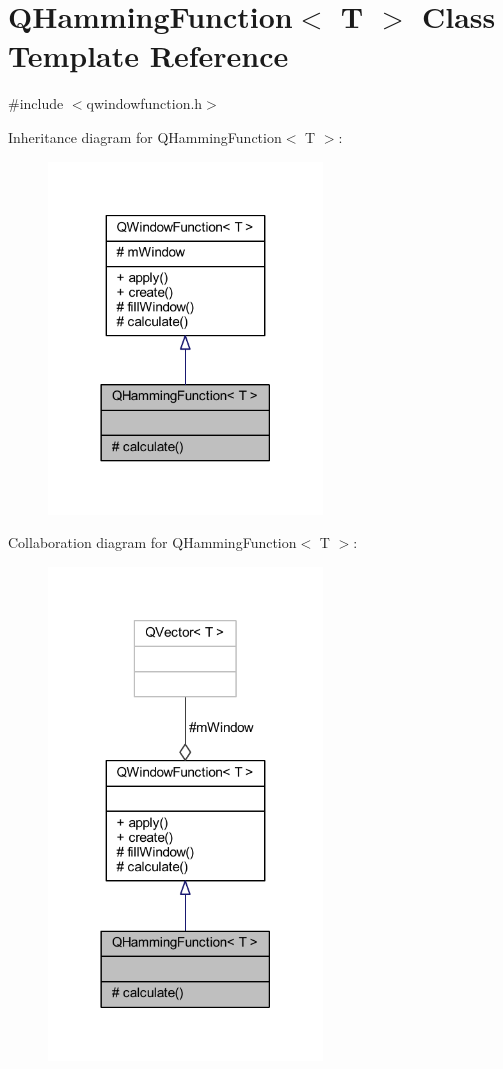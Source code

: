 \hypertarget{a00056}{\section{Q\+Hamming\+Function$<$ T $>$ Class Template Reference}
\label{a00056}
}


{\ttfamily \#include $<$qwindowfunction.\+h$>$}



Inheritance diagram for Q\+Hamming\+Function$<$ T $>$\+:
\nopagebreak
\begin{figure}[H]
\begin{center}
\leavevmode
\includegraphics[width=206pt]{d0/d2a/a00531}
\end{center}
\end{figure}


Collaboration diagram for Q\+Hamming\+Function$<$ T $>$\+:
\nopagebreak
\begin{figure}[H]
\begin{center}
\leavevmode
\includegraphics[width=206pt]{d7/d41/a00532}
\end{center}
\end{figure}
